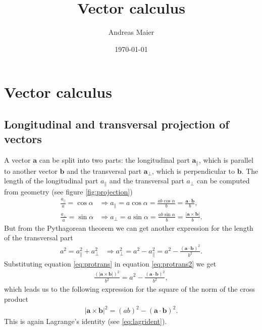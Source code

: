 \documentclass[12pt,a4paper,twoside]{book}
\title{Vector calculus}
\author{Andreas Maier}
\date{\today}
\newcommand{\abs}[1]{\left\lvert#1\right\rvert}
\renewcommand{\vec}[1]{\boldsymbol{#1}}
\begin{document}
\maketitle
\tableofcontents

\section{Vector calculus}

\subsection{Longitudinal and transversal projection of vectors}


A vector $\vec{a}$ can be split into two parts: the longitudinal part $\vec{a}_{\parallel}$, 
which is parallel to another vector $\vec{b}$ and the transversal part $\vec{a}_{\perp}$, 
which is perpendicular to $\vec{b}$. The length of the longitudinal part $a_{\parallel}$ 
and the transversal part $a_{\perp}$ can be computed from geometry (see figure \ref{fig:projection})
\begin{align}
\frac{a_{\parallel}}{a}=\cos \alpha & \Rightarrow
a_{\parallel}= a \cos\alpha = \frac{a b \cos \alpha}{b} = \frac{\vec{a}\cdot\vec{b}}{b},\\
\frac{a_{\perp}}{a}=\sin \alpha & \Rightarrow 
a_{\perp}= a \sin\alpha = \frac{a b \sin \alpha}{b} = \frac{\abs{\vec{a}\times\vec{b}}}{b}. \label{eq:protrans}
\end{align}
But from the Pythagorean theorem we can get another expression for the length of the transversal
part
\begin{align}
a^2=a_{\parallel}^2+a_{\perp}^2 & \Rightarrow
a_{\perp}^2 = a^2-a_{\parallel}^2= a^2-\frac{(\vec{a}\cdot\vec{b})^2}{b^2}.\label{eq:protrans2}
\end{align}
Substituting equation \eqref{eq:protrans} in equation \eqref{eq:protrans2} we get
\begin{align*}
\frac{(\abs{\vec{a}\times\vec{b}})^2}{b^2}=a^2-\frac{(\vec{a}\cdot\vec{b})^2}{b^2},
\end{align*}
which leads us to the following expression for the square of the norm of the cross product
\begin{align}
\abs{\vec{a}\times\vec{b}}^2 = (a b)^2 - (\vec{a}\cdot\vec{b})^2.
\end{align}
This is again Lagrange's identity (see \eqref{eq:lagrident}). 
\end{document}
